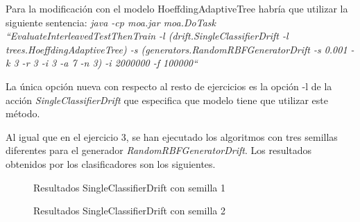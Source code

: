 Para la modificación con el modelo HoeffdingAdaptiveTree habría que utilizar
la siguiente sentencia:
\textit{java -cp moa.jar moa.DoTask \\ ``EvaluateInterleavedTestThenTrain -l
(drift.SingleClassifierDrift -l trees.HoeffdingAdaptiveTree) -s
(generators.RandomRBFGeneratorDrift -s 0.001 -k 3 -r 3 -i 3 -a 7 -n 3)
-i 2000000 -f 100000``}

La única opción nueva con respecto al resto de ejercicios es la opción -l de la acción \textit{SingleClassifierDrift} que especifica que modelo tiene que utilizar este método.

Al igual que en el ejercicio 3, se han ejecutado los algoritmos con tres semillas diferentes para el generador \textit{RandomRBFGeneratorDrift}. Los resultados obtenidos por los clasificadores son los siguientes.

\begin{figure}[H]
	\centering
	\caption{Resultados SingleClassifierDrift con semilla 1}
	\label{fig:res51}
\end{figure}

\begin{figure}[H]
	\centering
	\caption{Resultados SingleClassifierDrift con semilla 2}
	\label{fig:res52}
\end{figure}

